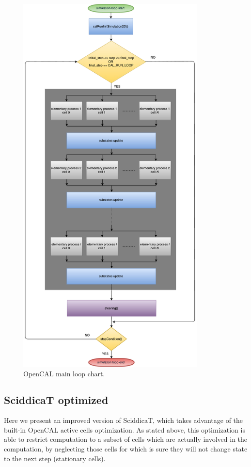 \begin{figure}[htbp]
  \centering
  \includegraphics[width=9.5cm]{./images/OpenCAL/opencal_main_loop.pdf}
  \caption{OpenCAL main loop chart.}
  \label{fig:opencal_main_loop}
\end{figure}


\subsection{SciddicaT optimized}
Here we present an improved version of SciddicaT, which takes
advantage of the built-in OpenCAL active cells optimization. As stated
above, this optimization is able to restrict computation to a subset
of cells which are actually involved in the computation, by neglecting
those cells for which is sure they will not change state to the next
step (stationary cells).

